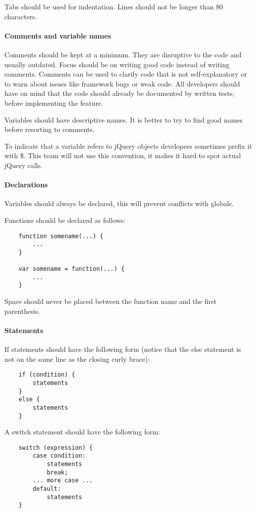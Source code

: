 Tabs should be used for indentation.
Lines should not be longer than 80 characters.

\paragraph{Comments and variable names} \hspace{1mm}

Comments should be kept at a minimum. They are disruptive to the code and
usually outdated. Focus should be on writing good code instead of writing comments. Comments can be used to
clarify code that is not self-explanatory or to warn about issues like
framework bugs or weak code. All developers should have on mind that the code should already
be documented by written tests, before implementing the feature.

Variables should have descriptive names. It is better to try to find good names before
resorting to comments.

To indicate that a variable refers to jQuery objects developers sometimes
prefix it with \$. This team will not use this convention, it makes it hard to
spot actual jQuery calls.

\paragraph{Declarations} \hspace{1mm}

Variables should always be declared, this will prevent conflicts with globals.

Functions should be declared as follows:

\begin{lstlisting}
	function somename(...) {
		...
	}

	var somename = function(...) {
		...
	}
\end{lstlisting}

Space should never be placed between the function name and the first parenthesis.

\paragraph{Statements} \hspace{1mm}

If statements should have the following form (notice that the else statement is
not on the same line as the closing curly brace):

\begin{lstlisting}
	if (condition) {
		statements
	}
	else {
		statements
	}
\end{lstlisting}

A switch statement should have the following form:

\begin{lstlisting}
	switch (expression) {
		case condition:
			statements
			break;
		... more case ...
		default:
			statements
	}
\end{lstlisting}
